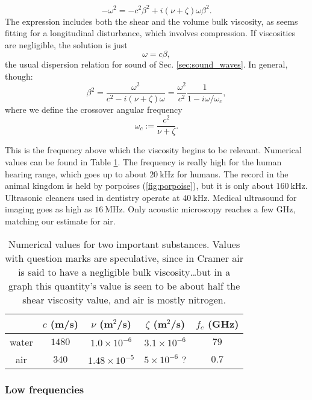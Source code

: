 \begin{equation}
  -\omega^2 = - c^2\beta^2 + i (\nu+\zeta)  \omega \beta^2 .
\end{equation}
The expression includes both the shear and the volume bulk viscosity,
as seems fitting for a longitudinal disturbance, which involves
compression. If viscosities are negligible, the solution is just
\[
\omega =  c \beta ,
\]
%
the usual dispersion relation for sound of
Sec. \ref{sec:sound_waves}. In general, though:
\begin{equation}
  \label{eq:waves_att_dispersion}
  \beta^2 =
  \frac{\omega^2}{c^2 - i(\nu+\zeta)\omega}=
  \frac{\omega^2}{c^2}\frac{1}{1 -  i\omega/\omega_c},
\end{equation}
where we define the crossover angular frequency 
\[
\omega_c := \frac{c^2}{\nu + \zeta }.
\]

This is the frequency above which the viscosity begins to be relevant.
Numerical values can be found in Table \ref{tbl:sound_att}. The
frequency is really high for the human hearing range, which goes up to
about $\SI{20}{\kilo\hertz}$ for humans. The record in the animal
kingdom is held by porpoises (\ref{fig:porpoise}), but it is only
about $\SI{160}{\kilo\hertz}$. Ultrasonic cleaners used in dentistry
operate at $\SI{40}{\kilo\hertz}$. Medical ultrasound for imaging goes
as high as $\SI{16}{\mega\hertz}$. Only acoustic microscopy
\cite{kp:AM} reaches a few \si{\giga\hertz}, matching our estimate for
air.

\begin{table}
\begin{tabular}{|c|c|c|c|c|}
  \hline
    & $ c$ (m/s) &  $ \nu$ (m$^2$/s) & $\zeta$ (m$^2$/s) & $ f_c$ (GHz)\\
  \hline
  \hline
  water & $1480$& $ 1.0 \times 10^{-6}$ & $ 3.1 \times 10^{-6}$ & $79$ \\
  \hline
  air & $340$   & $ 1.48\times 10^{-5}$ & $ 5 \times 10^{-6}$ ? & $0.7$ \\
  \hline
\end{tabular}
\caption{Numerical values for two important substances. Values with
  question marks are speculative, since in Cramer\cite{Cramer} air is
  said to have a negligible bulk viscosity\ldots but in a graph this
  quantity's value is seen to be about half the shear viscosity value,
  and air is mostly nitrogen.
 \label{tbl:sound_att}}
\end{table}


\subsubsection{Low frequencies}


